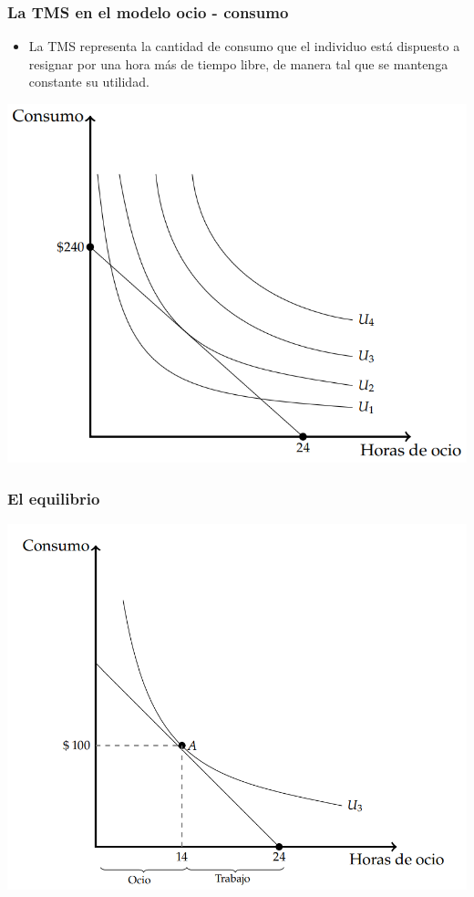\documentclass{beamer}
\begin{document}
\begin{frame}
  \frametitle{La TMS en el modelo ocio - consumo}
  \begin{itemize}
    \item La TMS representa la cantidad de consumo que el individuo está dispuesto a resignar por una hora más de tiempo libre, de manera tal que se mantenga constante su utilidad.
  \end{itemize}
  \begin{center}
    \includegraphics[scale=0.4]{../Figures/C9.3.png}
  \end{center}
\end{frame}

\begin{frame}
\frametitle{El equilibrio}
\begin{center}
\includegraphics[scale=0.6]{../Figures/C9.4.png}
\end{center}
\end{frame}
\end{document}
